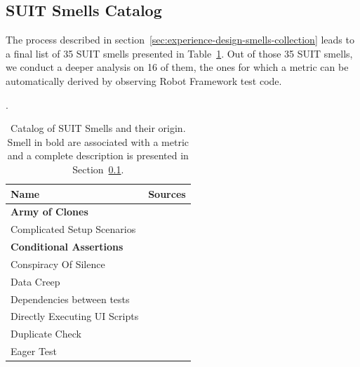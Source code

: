 \subsection{SUIT Smells Catalog}
\label{sec:results-smells-catalog}

The process described in section~\ref{sec:experience-design-smells-collection} leads to a final list of 35 SUIT smells presented in Table~\ref{tab:smell-catalog}. Out of those 35 SUIT smells, we conduct a deeper analysis on 16 of them, the ones for which a metric can be automatically derived by observing Robot Framework test code.

\begin{table}
\centering

\caption{Catalog of SUIT Smells and their origin. Smell in bold are associated with a metric and a complete description is presented in Section~\ref{sec:results-smells-catalog}.}
\label{tab:smell-catalog}.

\begin{tabular}{>{\raggedright}p{1.5in}>{\raggedright}p{4in}}

\toprule
\scriptsize{\textbf{Name}} & \scriptsize{\textbf{Sources}}\tabularnewline
\toprule

\scriptsize{\textbf{Army of Clones}} & \scriptsize{\cite{Chen2012, Hauptmann2013, Hauptmann2015, Jones2019}} \tabularnewline 


\scriptsize{Complicated Setup Scenarios} & \scriptsize{\cite{Scott2015}} \tabularnewline 

\scriptsize{\textbf{Conditional Assertions}} & \scriptsize{\cite{Gawinecki2016}} \tabularnewline 

\scriptsize{Conspiracy Of Silence} & \scriptsize{\cite{Gawinecki2016, Sheth2020}} \tabularnewline 

\scriptsize{Data Creep} & \scriptsize{\cite{Alegroth2016b, Siminiuc2019, Shay2019}} \tabularnewline 

\scriptsize{Dependencies between tests} & \scriptsize{\cite{Klarck2014, Advolodkin2018, Cripsin2018, Bushnev2019, Goldberg2019}} \tabularnewline 

\scriptsize{Directly Executing UI Scripts} & \scriptsize{\cite{Scott2015}} \tabularnewline 

\scriptsize{Duplicate Check} & \scriptsize{\cite{Buwalda2019}} \tabularnewline 

\scriptsize{Eager Test} &  \scriptsize{\cite{England2016, Renaudin2016, Cripsin2018, Sciamanna2019, Temov2020}} \tabularnewline 


\end{tabular}
\end{table}
